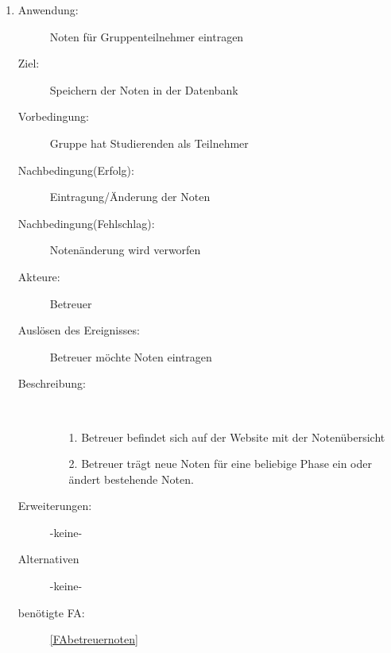\documentclass[parskip=full]{scrartcl}
\newcommand{\swtLabel}[1]{\textbf{/#1\arabic*0/}}
\begin{document}
\begin{enumerate} [label=\swtLabel{B}]
  
  \item
    \begin{description}
  	\item[Anwendung:] Noten für Gruppenteilnehmer eintragen
  	\item[Ziel:] Speichern der Noten in der Datenbank
  	\item[Vorbedingung:] Gruppe hat Studierenden als Teilnehmer
  	\item[Nachbedingung(Erfolg):] Eintragung/Änderung der Noten
  	\item[Nachbedingung(Fehlschlag):] Notenänderung wird verworfen
  	\item[Akteure:] Betreuer
  	\item[Auslösen des Ereignisses:] Betreuer möchte Noten eintragen
  	\item[Beschreibung:]~
  	\begin{enumerate} 
  	  \item[1.] Betreuer befindet sich auf der Website mit der Notenübersicht
  	  \item[2.] Betreuer trägt neue Noten für eine beliebige Phase ein oder
  	  ändert bestehende Noten.
  	\end{enumerate}
  	\item[Erweiterungen:] -keine-
  	\item[Alternativen] -keine-
  	\item[benötigte FA:] \ref{FAbetreuernoten}
  \end{description}
   
\end{enumerate}
\end{document}
